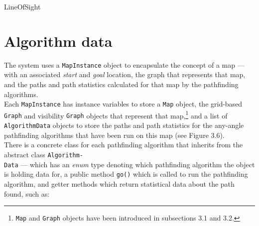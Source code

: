 \documentclass[12pt,notitlepage]{report}
\begin{document}
\begin{algorithm}
  \SetAlgoLined\DontPrintSemicolon
  \caption{{\sc LineOfSight}}
\end{algorithm} 

\section{Algorithm data}
The system uses a {\tt MapInstance} object to encapsulate the concept of a map --- with an associated {\em start} and {\em goal} location, the graph that represents that map, and the paths and path statistics calculated for that map by the pathfinding algorithms.\\

\noindent
Each {\tt MapInstance} has instance variables to store a {\tt Map} object, the grid-based {\tt Graph} and visibility {\tt Graph} objects that represent that map,\footnote{{\tt Map} and {\tt Graph} objects have been introduced in subsections 3.1 and 3.2.} and a list of {\tt AlgorithmData} objects to store the paths and path statistics for the any-angle pathfinding algorithms that have been run on this map (see Figure 3.6).\\

\noindent
There is a concrete class for each pathfinding algorithm that inherits from the abstract class {\tt Algorithm-}\\{\tt Data} --- which  has an {\em enum} type denoting which pathfinding algorithm the object is holding data for, a public method {\tt go()} which is called to run the pathfinding algorithm, and getter methods which return statistical data about the path found, such as:
\end{document}
